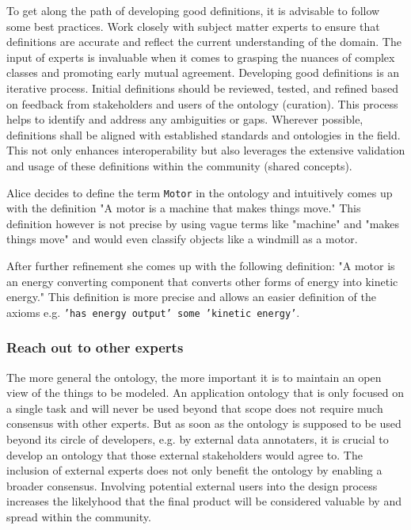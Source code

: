 To get along the path of developing good definitions, it is advisable to follow some best practices.
Work closely with subject matter experts to ensure that definitions are accurate and reflect the current understanding of the domain. The input of experts is invaluable when it comes to grasping the nuances of complex classes and promoting early mutual agreement. Developing good definitions is an iterative process. Initial definitions should be reviewed, tested, and refined based on feedback from stakeholders and users of the ontology (curation). This process helps to identify and address any ambiguities or gaps.
Wherever possible, definitions shall be aligned with established standards and ontologies in the field. This not only enhances interoperability but also leverages the extensive validation and usage of these definitions within the community (shared concepts).

\begin{example}
    Alice decides to define the term \texttt{Motor} in the ontology and intuitively comes up with the definition "A motor is a machine that makes things move." This definition however is not precise by using vague terms like "machine" and "makes things move" and would even classify objects like a windmill as a motor.
    
    After further refinement she comes up with the following definition: "A motor is an energy converting component that converts other forms of energy into kinetic energy." This definition is more precise and allows an easier definition of the axioms e.g. \texttt{'has energy output' some 'kinetic energy'}.
\end{example}

\subsubsection{Reach out to other experts}

The more general the ontology, the more important it is to maintain an open view of the things to be modeled. An application ontology that is only focused on a single task and will never be used beyond that scope does not require much consensus with other experts. But as soon as the ontology is supposed to be used beyond its circle of developers, e.g. by external data annotaters, it is crucial to develop an ontology that those external stakeholders would agree to. The inclusion of external experts does not only benefit the ontology by enabling a broader consensus. Involving potential external users into the design process increases the likelyhood that the final product will be considered valuable by and spread within the community.

